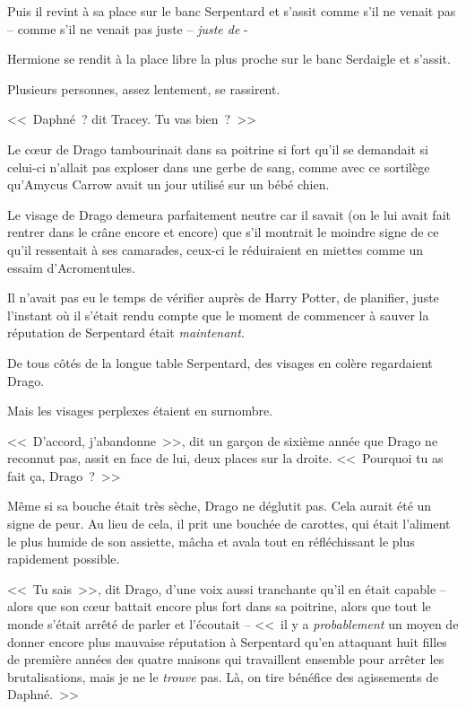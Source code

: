 Puis il revint à sa place sur le banc Serpentard et s'assit comme s'il ne venait pas -- comme s'il ne venait pas juste -- \emph{juste de} -

Hermione se rendit à la place libre la plus proche sur le banc Serdaigle et s'assit.

Plusieurs personnes, assez lentement, se rassirent.

<<~Daphné~? dit Tracey. Tu vas bien~?~>>

\later

Le cœur de Drago tambourinait dans sa poitrine si fort qu'il se demandait si celui-ci n'allait pas exploser dans une gerbe de sang, comme avec ce sortilège qu'Amycus Carrow avait un jour utilisé sur un bébé chien.

Le visage de Drago demeura parfaitement neutre car il savait (on le lui avait fait rentrer dans le crâne encore et encore) que s'il montrait le moindre signe de ce qu'il ressentait à ses camarades, ceux-ci le réduiraient en miettes comme un essaim d'Acromentules.

Il n'avait pas eu le temps de vérifier auprès de Harry Potter, de planifier, juste l'instant où il s'était rendu compte que le moment de commencer à sauver la réputation de Serpentard était \emph{maintenant}.

De tous côtés de la longue table Serpentard, des visages en colère regardaient Drago.

Mais les visages perplexes étaient en surnombre.

<<~D'accord, j'abandonne~>>, dit un garçon de sixième année que Drago ne reconnut pas, assit en face de lui, deux places sur la droite. <<~Pourquoi tu as fait ça, Drago~?~>>

Même si sa bouche était très sèche, Drago ne déglutit pas. Cela aurait été un signe de peur. Au lieu de cela, il prit une bouchée de carottes, qui était l'aliment le plus humide de son assiette, mâcha et avala tout en réfléchissant le plus rapidement possible.

<<~Tu sais~>>, dit Drago, d'une voix aussi tranchante qu'il en était capable -- alors que son cœur battait encore plus fort dans sa poitrine, alors que tout le monde s'était arrêté de parler et l'écoutait -- <<~il y a \emph{probablement} un moyen de donner encore plus mauvaise réputation à Serpentard qu'en attaquant huit filles de première années des quatre maisons qui travaillent ensemble pour arrêter les brutalisations, mais je ne le \emph{trouve} pas. Là, on tire bénéfice des agissements de Daphné.~>>

